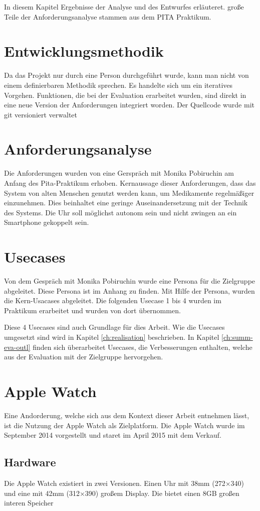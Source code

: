 In diesem Kapitel Ergebnisse der Analyse und des Entwurfes erläuteret. große Teile der Anforderungsanalyse stammen aus dem PITA Praktikum.
\section{Entwicklungsmethodik}
Da das Projekt nur durch eine Person durchgeführt wurde, kann man nicht von einem definierbaren Methodik sprechen. Es handelte sich um ein iteratives Vorgehen. Funktionen, die bei der Evaluation erarbeitet wurden, sind direkt in eine neue Version der Anforderungen integriert worden. Der Quellcode wurde mit \gls{git} versioniert verwaltet
\section{Anforderungsanalyse}
Die Anforderungen wurden von eine Gerspräch mit Monika Pobiruchin am Anfang des Pita-Praktikum erhoben. Kernaussage dieser Anforderungen, dass das System von alten Menschen genutzt werden kann, um Medikamente regelmäßiger einzunehmen. Dies beinhaltet eine geringe Auseinandersetzung mit der Technik des Systems. Die Uhr soll möglichst autonom sein und nicht zwingen an ein Smartphone gekoppelt sein.

\section{Usecases} 
Von dem Gespräch mit Monika Pobiruchin wurde eine Persona für die Zielgruppe abgeleitet. Diese Persona ist im Anhang zu finden.
Mit Hilfe der Persona, wurden die Kern-Usacases abgeleitet. Die folgenden Usecase 1 bis 4 wurden im Praktikum erarbeitet und wurden von dort übernommen. 

Diese 4 Usecases sind auch Grundlage für dies Arbeit. Wie die Usecases umgesetzt sind wird in Kapitel \ref{ch:realisation} beschrieben. In Kapitel \ref{ch:summ-eva-outl} finden sich überarbeitet Usecases, die Verbesserungen enthalten, welche aus der Evaluation mit der Zielgruppe hervorgehen.

\section{Apple Watch}
Eine Andorderung, welche sich aus dem Kontext dieser Arbeit entnehmen lässt, ist die Nutzung der Apple Watch als Zielplatform. Die Apple Watch wurde im September 2014 vorgestellt und staret im April 2015 mit dem Verkauf.
\subsection{Hardware}
Die Apple Watch existiert in zwei Versionen. Einen Uhr mit 38mm (272×340) und eine mit 42mm (312×390) großem Display. Die bietet einen 8GB großen interen Speicher